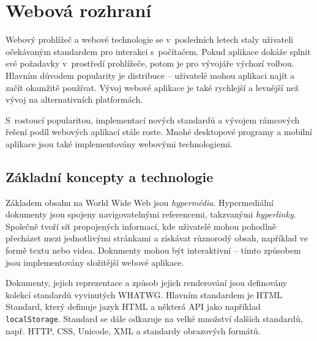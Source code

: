 %
%

\chapter{Webová rozhraní}
\label{webchapter}

Webový prohlížeč a webové technologie se v~posledních letech staly uživateli očekávaným standardem pro interakci s~počítačem.
Pokud aplikace dokáže splnit své požadavky v~prostředí prohlížeče, potom je pro vývojáře výchozí volbou.
Hlavním důvodem popularity je distribuce -- uživatelé mohou aplikaci najít a začít okamžitě používat.
Vývoj webové aplikace je také rychlejší a levnější než vývoj na alternativních platformách.


S~rostoucí popularitou, implementací nových standardů a vývojem rámcových řešení podíl webových aplikací stále roste.
Mnohé desktopové programy a mobilní aplikace jsou také implementovány webovými technologiemi.

\section{Základní koncepty a technologie}

Základem obsahu na World Wide Web jsou \emph{hypermédia}.
Hypermediální dokumenty jsou spojeny navigovatelnými referencemi, takzvanými \emph{hyperlinky}.
Společně tvoří síť propojených informací, kde uživatelé mohou pohodlně přecházet mezi jednotlivými stránkami a získávat různorodý obsah, například ve formě textu nebo videa.
Dokumenty mohou být interaktivní -- tímto způsobem jsou implementovány složitější webové aplikace.

Dokumenty, jejich reprezentace a způsob jejich renderování jsou definovány kolekcí standardů vyvinutých WHATWG. Hlavním standardem je HTML Standard, který definuje jazyk HTML a některá API jako například \texttt{localStorage}.
Standard se dále odkazuje na velké množství dalších standardů, např. HTTP, CSS, Unicode, XML a standardy obrazových formátů. \cite{htmlStandard}

